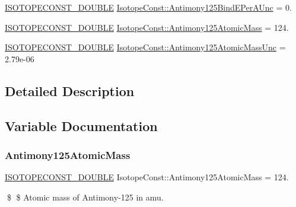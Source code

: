 \begin{DoxyCompactItemize}
\mbox{\hyperlink{group___isotope_const-_macros_ga8f45a7272ce02c0b4c65c44636ed719a}{I\+S\+O\+T\+O\+P\+E\+C\+O\+N\+S\+T\+\_\+\+D\+O\+U\+B\+LE}} \mbox{\hyperlink{group___isotope_const-_antimony-_sb125_ga07e84f550b2d5889b796bee3d63a22c5}{Isotope\+Const\+::\+Antimony125\+Bind\+E\+Per\+A\+Unc}} = 0.
\item 
\mbox{\hyperlink{group___isotope_const-_macros_ga8f45a7272ce02c0b4c65c44636ed719a}{I\+S\+O\+T\+O\+P\+E\+C\+O\+N\+S\+T\+\_\+\+D\+O\+U\+B\+LE}} \mbox{\hyperlink{group___isotope_const-_antimony-_sb125_gacec1ea2a11b17e9be575a281572084a0}{Isotope\+Const\+::\+Antimony125\+Atomic\+Mass}} = 124.
\item 
\mbox{\hyperlink{group___isotope_const-_macros_ga8f45a7272ce02c0b4c65c44636ed719a}{I\+S\+O\+T\+O\+P\+E\+C\+O\+N\+S\+T\+\_\+\+D\+O\+U\+B\+LE}} \mbox{\hyperlink{group___isotope_const-_antimony-_sb125_ga04858575d5563c4fadda68eff3c5377f}{Isotope\+Const\+::\+Antimony125\+Atomic\+Mass\+Unc}} = 2.\+79e-\/06
\end{DoxyCompactItemize}


\subsection{Detailed Description}


\subsection{Variable Documentation}
\mbox{\label{group___isotope_const-_antimony-_sb125_gacec1ea2a11b17e9be575a281572084a0}} 
\subsubsection{\texorpdfstring{Antimony125\+Atomic\+Mass}{Antimony125AtomicMass}}
{\footnotesize\ttfamily \mbox{\hyperlink{group___isotope_const-_macros_ga8f45a7272ce02c0b4c65c44636ed719a}{I\+S\+O\+T\+O\+P\+E\+C\+O\+N\+S\+T\+\_\+\+D\+O\+U\+B\+LE}} Isotope\+Const\+::\+Antimony125\+Atomic\+Mass = 124.}

\$ \$ Atomic mass of Antimony-\/125 in amu. \mbox{\label{group___isotope_const-_antimony-_sb125_ga04858575d5563c4fadda68eff3c5377f}} 
